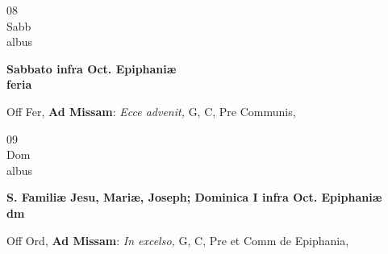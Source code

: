 \documentclass[10pt, openany]{book}
\begin{document}
        \begin{center}
            \begin{minipage}{3.5in}
                \vspace{2em}
                \begin{minipage}{0.5in}
                    {\Huge 08} \\
                    {\normalsize Sabb} \\
                    {\normalsize albus}
                \end{minipage}
                \begin{minipage}{3.0in}
                    \textbf{ \large Sabbato infra Oct. Epiphaniæ \\
                    \textnormal{\normalsize feria}} \\ 
                \end{minipage}
                \begin{justify}Off Fer, \textbf{Ad Missam}: \textit{Ecce advenit,} G, C, Pre Communis,   
                \end{justify}
            \end{minipage}
        \end{center}
    
        \begin{center}
            \begin{minipage}{3.5in}
                \vspace{2em}
                \begin{minipage}{0.5in}
                    {\Huge 09} \\
                    {\normalsize Dom} \\
                    {\normalsize albus}
                \end{minipage}
                \begin{minipage}{3.0in}
                    \textbf{ \large S. Familiæ Jesu, Mariæ, Joseph; Dominica I infra Oct. Epiphaniæ \\
                    \textnormal{\normalsize dm}} \\ 
                \end{minipage}
                \begin{justify}Off Ord, \textbf{Ad Missam}: \textit{In excelso,} G, C, Pre et Comm de Epiphania,   
                \end{justify}
            \end{minipage}
        \end{center}
    
\end{document}

